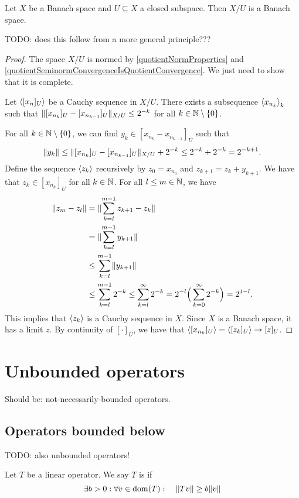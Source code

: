 \begin{proposition} \label{quotientBanachSpace}
Let $X$ be a Banach space and $U\subseteq X$ a closed subspace. Then $X/U$ is a Banach space.
\end{proposition}
TODO: does this follow from a more general principle???
\begin{proof}
The space $X/U$ is normed by \ref{quotientNormProperties} and \ref{quotientSeminormConvergenceIsQuotientConvergence}. We just need to show that it is complete.

Let $\left\langle [x_n]_U \right\rangle$ be a Cauchy sequence in $X/U$. There exists a subsequence $\left\langle x_{n_k} \right\rangle_k$ such that $\lVert[x_{n_k}]_U - [x_{n_{k-1}}]_U\rVert_{X/U} \leq 2^{-k}$ for all $k\in \mathbb{N}\setminus\{0\}$.

For all $k\in \mathbb{N}\setminus\{0\}$, we can find $y_{k} \in [x_{n_k} - x_{n_{k-1}}]_U$ such that
\[ \lVert y_k\rVert \leq \lVert[x_{n_k}]_U - [x_{n_{k-1}}]_U\rVert_{X/U} + 2^{-k} \leq 2^{-k}+2^{-k} = 2^{-k+1}. \]
Define the sequence $\left\langle z_k \right\rangle$ recursively by $z_0 = x_{n_0}$ and $z_{k+1} = z_{k}+ y_{k+1}$. We have that $z_k \in [x_{n_k}]_U$ for all $k\in \mathbb{N}$. For all $l\leq m \in \mathbb{N}$, we have
\begin{align*}
\lVert z_m - z_l\rVert &= \lVert\sum_{k=l}^{m-1} z_{k+1} - z_{k}\rVert \\
&= \lVert\sum_{k=l}^{m-1} y_{k+1}\rVert \\
&\leq \sum_{k=l}^{m-1}\lVert y_{k+1}\rVert \\
&\leq \sum_{k=l}^{m-1}2^{-k} \leq \sum_{k=l}^{\infty}2^{-k} = 2^{-l}\Big(\sum_{k=0}^{\infty}2^{-k}\Big) = 2^{1-l}.
\end{align*}
This implies that $\left\langle z_k \right\rangle$ is a Cauchy sequence in $X$. Since $X$ is a Banach space, it has a limit $z$. By continuity of $[\cdot]_U$, we have that $\left\langle [x_{n_k}]_U \right\rangle = \left\langle [z_k]_U \right\rangle \to [z]_U$.
\end{proof}

\section{Unbounded operators}
Should be: not-necessarily-bounded operators.
\subsection{Operators bounded below}
TODO: also unbounded operators!
\begin{definition}
Let $T$ be a linear operator. We say $T$ is  if
\[ \exists b>0:\forall v\in \operatorname{dom}(T): \quad \lVert Tv\rVert\geq b\lVert v\rVert \]
\end{definition}


